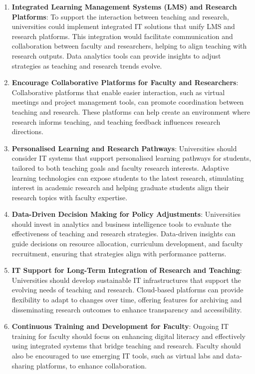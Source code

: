 \documentclass[a4paper, conference]{IEEEtran}
\begin{document}
\begin{enumerate}
	\item \textbf{Integrated Learning Management Systems (LMS) and Research Platforms}: To support the interaction between teaching and research, universities could implement integrated IT solutions that unify LMS and research platforms. This integration would facilitate communication and collaboration between faculty and researchers, helping to align teaching with research outputs. Data analytics tools can provide insights to adjust strategies as teaching and research trends evolve.
	
	\item \textbf{Encourage Collaborative Platforms for Faculty and Researchers}: Collaborative platforms that enable easier interaction, such as virtual meetings and project management tools, can promote coordination between teaching and research. These platforms can help create an environment where research informs teaching, and teaching feedback influences research directions.
	
	\item \textbf{Personalised Learning and Research Pathways}: Universities should consider IT systems that support personalised learning pathways for students, tailored to both teaching goals and faculty research interests. Adaptive learning technologies can expose students to the latest research, stimulating interest in academic research and helping graduate students align their research topics with faculty expertise.
	
	\item \textbf{Data-Driven Decision Making for Policy Adjustments}: Universities should invest in analytics and business intelligence tools to evaluate the effectiveness of teaching and research strategies. Data-driven insights can guide decisions on resource allocation, curriculum development, and faculty recruitment, ensuring that strategies align with performance patterns.
	
	\item \textbf{IT Support for Long-Term Integration of Research and Teaching}: Universities should develop sustainable IT infrastructures that support the evolving needs of teaching and research. Cloud-based platforms can provide flexibility to adapt to changes over time, offering features for archiving and disseminating research outcomes to enhance transparency and accessibility.
	
	\item \textbf{Continuous Training and Development for Faculty}: Ongoing IT training for faculty should focus on enhancing digital literacy and effectively using integrated systems that bridge teaching and research. Faculty should also be encouraged to use emerging IT tools, such as virtual labs and data-sharing platforms, to enhance collaboration.
	

\end{enumerate}
\end{document}

